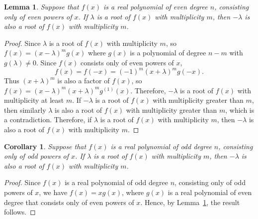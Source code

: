 \documentclass[10pt,a4paper]{amsart}
\newtheorem{lemma}{Lemma}[section]
\newtheorem{cor}{Corollary}[section]
\numberwithin{equation}{section}
\begin{document}
	
	
	\begin{lemma} \label{lem1}
		Suppose that $f(x)$ is a real polynomial of even degree $n$, consisting only of even powers of $x$. If $\lambda$ is a root of $f(x)$ with multiplicity $m$, then $-\lambda$ is also a root of $f(x)$ with multiplicity $m$.
	\end{lemma}
	\begin{proof}
		Since $\lambda$ is a root of $f(x)$ with multiplicity $m$, so $f(x)=(x-\lambda)^mg(x)$ where $g(x)$ is a polynomial of degree $n-m$ with $g(\lambda)\neq 0$. Since $f(x)$ consists only of even powers of $x$, $$f(x)=f(-x)=(-1)^m(x+\lambda)^mg(-x).$$
		Thus $(x+\lambda)^m$ is also a factor of $f(x)$, so $f(x)=(x-\lambda)^m(x+\lambda)^mg^{(1)}(x)$. Therefore, $-\lambda$ is a root of $f(x)$ with multiplicity at least $m$. If $-\lambda$ is a root of $f(x)$ with multiplicity greater than $m$, then similarly $\lambda$ is also a root of $f(x)$ with multiplicity greater than $m$, which is a contradiction. Therefore, if $\lambda$ is a root of $f(x)$ with multiplicity $m$, then $-\lambda$ is also a root of $f(x)$ with multiplicity $m$.
	\end{proof}
	
	\begin{cor} \label{xlem1}
		Suppose that $f(x)$ is a real polynomial of odd degree $n$, consisting only of odd powers of $x$. If $\lambda$ is a root of $f(x)$ with multiplicity $m$, then $-\lambda$ is also a root of $f(x)$ with multiplicity $m$.
	\end{cor}
	\begin{proof}
		Since $f(x)$ is a real polynomial of odd degree $n$, consisting only of odd powers of $x$, we have $f(x)=xg(x)$, where $g(x)$ is a real polynomial of even degree that consists only of even powers of $x$. Hence, by Lemma~\ref{lem1}, the result follows.
	\end{proof}
	
\end{document}

